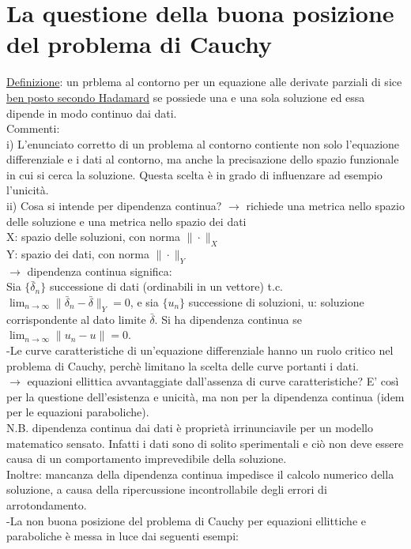 \documentclass[a4paper,11pt]{report}
\begin{document}
\section{La questione della buona posizione del problema di Cauchy}
\underline{Definizione}: un prblema al contorno per un equazione alle derivate parziali di sice \underline{ben posto secondo Hadamard} se possiede una e una sola soluzione ed essa dipende in modo continuo dai dati.\\
Commenti:\\
i) L'enunciato corretto di un problema al contorno contiente non solo l'equazione differenziale e i dati al contorno, ma anche la precisazione dello spazio funzionale in cui si cerca la soluzione. Questa scelta è in grado di influenzare ad esempio l'unicità.\\
ii) Cosa si intende per dipendenza continua? $\rightarrow$ richiede una metrica nello spazio delle soluzione e una metrica nello spazio dei dati\\
X: spazio delle soluzioni, con norma $\| \cdot \|_X$\\
Y: spazio dei dati, con norma $\| \cdot \|_Y$\\
$\rightarrow$ dipendenza continua significa:\\
Sia $\{\bar{\delta}_n\}$ successione di dati (ordinabili in un vettore) t.c.  $\lim_{n\to\infty} \| \bar{\delta}_n - \bar{\delta}\|_Y=0$, e sia $\{u_n\}$ successione di soluzioni, u: soluzione corrispondente al dato limite $\bar{\delta}$. Si ha dipendenza continua se $\lim_{n\to \infty}\|u_n - u \|=0$.\\
-Le curve caratteristiche di un'equazione differenziale hanno un ruolo critico nel problema di Cauchy, perchè limitano la scelta delle curve portanti i dati.\\
$\rightarrow$ equazioni ellittica avvantaggiate dall'assenza di curve caratteristiche? E' così per la questione dell'esistenza e unicità, ma non per la dipendenza continua (idem per le equazioni paraboliche).\\
N.B. dipendenza continua dai dati è proprietà irrinunciavile per un modello matematico sensato. Infatti i dati sono di solito sperimentali e ciò non deve essere causa di un comportamento imprevedibile della soluzione.\\
Inoltre: mancanza della dipendenza continua impedisce il calcolo numerico della soluzione, a causa della ripercussione incontrollabile degli errori di arrotondamento.\\
-La non buona posizione del problema di Cauchy per equazioni ellittiche e paraboliche è messa in luce dai seguenti esempi:\\
\end{document}
